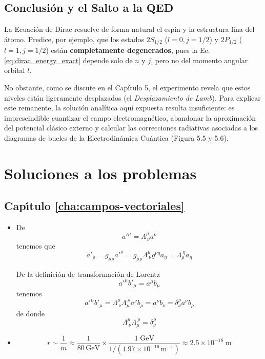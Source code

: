 \section{Conclusión y el Salto a la QED}
La Ecuación de Dirac resuelve de forma natural el espín y la estructura fina del átomo. Predice, por ejemplo, que los estados $2S_{1/2}$ ($l=0, j=1/2$) y $2P_{1/2}$ ($l=1, j=1/2$) están \textbf{completamente degenerados}, pues la Ec. \eqref{eq:dirac_energy_exact} depende solo de $n$ y $j$, pero no del momento angular orbital $l$.

No obstante, como se discute en el Capítulo 5, el experimento revela que estos niveles están ligeramente desplazados (el \textit{Desplazamiento de Lamb}). Para explicar este remanente, la solución analítica aquí expuesta resulta insuficiente: es imprescindible cuantizar el campo electromagnético, abandonar la aproximación del potencial clásico externo y calcular las correcciones radiativas asociadas a los diagramas de bucles de la Electrodinámica Cuántica (Figura 5.5 y 5.6).




\chapter{Soluciones a los problemas}

\section*{Cap\'\i tulo \ref{cha:campos-vectoriales}}

\begin{itemize}
\item[\ref{cha:campos-vectoriales}.\ref{item:pch2.1}.] De
\begin{equation}
  {a'}^\mu=\Lambda^{\mu}_{\ \nu}a^\nu
\end{equation}
tenemos que
\begin{equation}
  {a'}_\rho=g_{\mu\rho}{a'}^\rho=g_{\mu\rho}\Lambda^{\mu}_{\ \nu}g^{\nu\eta}a_\eta=\Lambda^{\ \eta}_{\rho}a_\eta
\end{equation}

De la definici\'on de transformaci\'on de Lorentz
\begin{equation}
  {a'}^{\mu}{b'}_\mu=a^{\mu}b_\mu
\end{equation}
tenemos
\begin{equation}
   {a'}^{\mu}{b'}_\mu=\Lambda^{\mu}_{\ \nu}\Lambda_{\mu}^{\ \rho}a^{\nu}b_\rho=a^\nu b_\nu=\delta^\rho_\nu a^\nu b_\rho
\end{equation}
de donde
\begin{equation}
  \Lambda^{\mu}_{\ \nu}\Lambda_{\mu}^{\ \rho}=\delta^\rho_\nu
\end{equation}

\item[\ref{cha:campos-vectoriales}.\ref{item:pch2.3}.] 
\begin{equation}
  r\sim\frac{1}{m}\approx\frac{1}{80\,\text{GeV}}\times\frac{1\;\text{GeV}}{1/(1.97\times10^{-16}\,\text{m}^{-1})}\approx2.5\times10^{-18}\;\text{m}
\end{equation}

\end{itemize}

